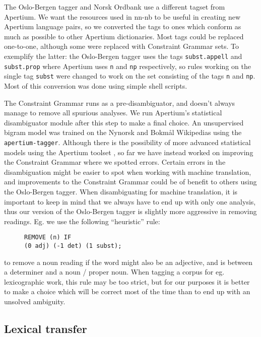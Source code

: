 \documentclass[11pt]{article}
\begin{document}
The Oslo-Bergen tagger and Norsk Ordbank use a different tagset from
Apertium. We want the resources used in nn-nb to be useful in creating
new Apertium language pairs, so we converted the tags to ones which
conform as much as possible to other Apertium dictionaries. Most tags
could be replaced one-to-one, although some were replaced with
Constraint Grammar sets. To exemplify the latter: the Oslo-Bergen
tagger uses the tags {\tt subst.appell} and
{\tt subst.prop} where Apertium uses {\tt n} and
{\tt np} respectively, so rules working on the single tag
{\tt subst} were changed to work on the set consisting of the
tags {\tt n} and {\tt np}. Most of this conversion was done
using simple shell scripts.

The Constraint Grammar runs as a pre-disambiguator, and doesn't always
manage to remove all spurious analyses. We run Apertium's statistical
disambiguator module after this step to make a final choice. An
unsupervised bigram model was trained on the Nynorsk and Bokmål
Wikipedias using the {\tt apertium-tagger}. Although there is the
possibility of more advanced statistical models using the Apertium
toolset \citep[see~eg.~][]{sanchez2008utl,sheikh2009trigram}, so far
we have instead worked on improving the Constraint Grammar where we
spotted errors. Certain errors in the disambiguation might be easier
to spot when working with machine translation, and improvements to the
Constraint Grammar could be of benefit to others using the Oslo-Bergen
tagger. When disambiguating for machine translation, it is important
to keep in mind that we always have to end up with only one analysis,
thus our version of the Oslo-Bergen tagger is slightly more aggressive
in removing readings. Eg. we use the following ``heuristic'' rule:

\begin{figure}[htp] {\tt REMOVE (n) IF\\
    (0 adj) (-1 det) (1 subst);}
\end{figure}

to remove a noun reading if the word might also be an adjective,
and is between a determiner and a noun / proper noun. When tagging a
corpus for eg. lexicographic work, this rule may be too strict, but
for our purposes it is better to make a choice which will be correct
most of the time than to end up with an unsolved ambiguity.

\subsection{Lexical transfer}
\end{document}
